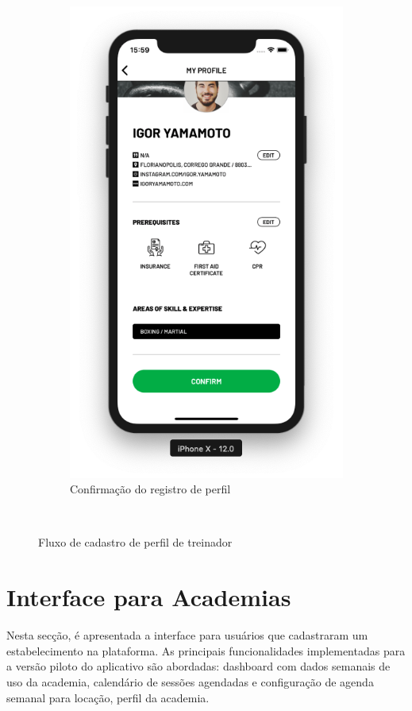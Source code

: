 \begin{figure}[H]
\begin{subfigure}[b]{0.3\textwidth}
        \includegraphics[width=\textwidth]{pfc/figuras/tr-register-profile-3.png}
        \caption{Confirmação do registro de perfil}
        \label{fig:register-tr-profile-confirmation}
    \end{subfigure}
    ~
    \caption{Fluxo de cadastro de perfil de treinador}
    \label{fig:register-tr-profile}
\end{figure}

\section{Interface para Academias}
Nesta secção, é apresentada a interface para usuários que cadastraram um estabelecimento na plataforma. As principais funcionalidades implementadas para a versão piloto do aplicativo são abordadas: dashboard com dados semanais de uso da academia, calendário de sessões agendadas e configuração de agenda semanal para locação, perfil da academia.


